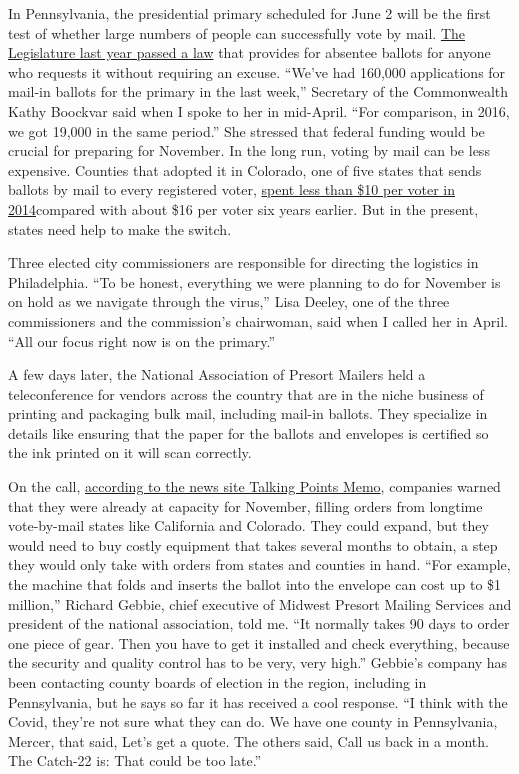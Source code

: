 In Pennsylvania, the presidential primary scheduled for June 2 will be
the first test of whether large numbers of people can successfully vote
by mail.
\href{https://triblive.com/news/pennsylvania/sweeping-changes-to-pennsylvania-election-law-could-make-early-voting-a-norm/}{The
Legislature last year passed a law} that provides for absentee ballots
for anyone who requests it without requiring an excuse. ``We've had
160,000 applications for mail-in ballots for the primary in the last
week,'' Secretary of the Commonwealth Kathy Boockvar said when I spoke
to her in mid-April. ``For comparison, in 2016, we got 19,000 in the
same period.'' She stressed that federal funding would be crucial for
preparing for November. In the long run, voting by mail can be less
expensive. Counties that adopted it in Colorado, one of five states that
sends ballots by mail to every registered voter,
\href{https://www.pewtrusts.org/en/research-and-analysis/issue-briefs/2016/03/colorado-voting-reforms-early-results}{spent
less than \$10 per voter in 2014}compared with about \$16 per voter six
years earlier. But in the present, states need help to make the switch.

Three elected city commissioners are responsible for directing the
logistics in Philadelphia. ``To be honest, everything we were planning
to do for November is on hold as we navigate through the virus,'' Lisa
Deeley, one of the three commissioners and the commission's chairwoman,
said when I called her in April. ``All our focus right now is on the
primary.''

A few days later, the National Association of Presort Mailers held a
teleconference for vendors across the country that are in the niche
business of printing and packaging bulk mail, including mail-in ballots.
They specialize in details like ensuring that the paper for the ballots
and envelopes is certified so the ink printed on it will scan correctly.

On the call,
\href{https://talkingpointsmemo.com/news/mail-in-elections-covid-19-supply}{according
to the news site Talking Points Memo}, companies warned that they were
already at capacity for November, filling orders from longtime
vote-by-mail states like California and Colorado. They could expand, but
they would need to buy costly equipment that takes several months to
obtain, a step they would only take with orders from states and counties
in hand. ``For example, the machine that folds and inserts the ballot
into the envelope can cost up to \$1 million,'' Richard Gebbie, chief
executive of Midwest Presort Mailing Services and president of the
national association, told me. ``It normally takes 90 days to order one
piece of gear. Then you have to get it installed and check everything,
because the security and quality control has to be very, very high.''
Gebbie's company has been contacting county boards of election in the
region, including in Pennsylvania, but he says so far it has received a
cool response. ``I think with the Covid, they're not sure what they can
do. We have one county in Pennsylvania, Mercer, that said, Let's get a
quote. The others said, Call us back in a month. The Catch-22 is: That
could be too late.''

